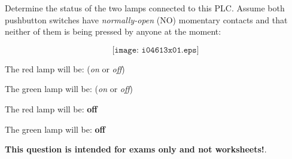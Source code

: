 

Determine the status of the two lamps connected to this PLC.  Assume both pushbutton switches have {\it normally-open} (NO) momentary contacts and that neither of them is being pressed by anyone at the moment:

$$\texttt{[image: i04613x01.eps]}$$

\vskip 10pt

The red lamp will be: ({\it on} or {\it off})

\vskip 10pt

The green lamp will be: ({\it on} or {\it off})







The red lamp will be: {\bf off}

\vskip 10pt

The green lamp will be: {\bf off}







{\bf This question is intended for exams only and not worksheets!}.


